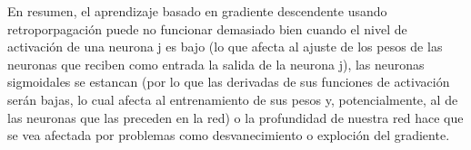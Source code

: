 En resumen, el aprendizaje basado en gradiente descendente usando retroporpagación puede no funcionar demasiado bien cuando el nivel de activación de una neurona j es bajo (lo que afecta al ajuste de los pesos de las neuronas que reciben como entrada la salida de la neurona j), las neuronas sigmoidales se estancan (por lo que las derivadas de sus funciones
de activación serán bajas, lo cual afecta al entrenamiento de sus pesos y, potencialmente, al de las neuronas que las preceden en la red) o la profundidad de nuestra red hace que se vea afectada por problemas como desvanecimiento o exploción del gradiente.

